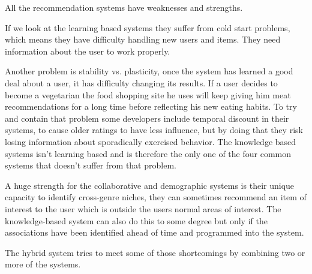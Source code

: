 All the recommendation systems have weaknesses and strengths.

If we look at the learning based systems they suffer from cold start problems, which means they have difficulty handling new users and items. They need information about the user to work properly.

Another problem is stability vs. plasticity, once the system has learned a good deal about a user, it has difficulty changing its results. If a user decides to become a vegetarian the food shopping site he uses will keep giving him meat recommendations for a long time before reflecting his new eating habits. To try and contain that problem some developers include temporal discount in their systems, to cause older ratings to have less influence, but by doing that they risk losing information about sporadically exercised behavior. The knowledge based systems isn't learning based and is therefore the only one of the four common systems that doesn't suffer from that problem.

A huge strength for the collaborative and demographic systems is their unique capacity to identify cross-genre niches, they can sometimes recommend an item of interest to the user which is outside the users normal areas of interest. The knowledge-based system can also do this to some degree but only if the associations have been identified ahead of time and programmed into the system.

The hybrid system tries to meet some of those shortcomings by combining two or more of the systems.